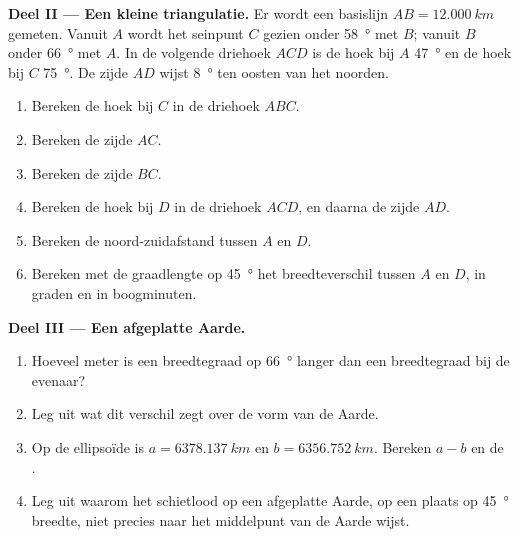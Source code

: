 \begin{problem}
\medskip
\noindent\textbf{Deel II --- Een kleine triangulatie.}
Er wordt een basislijn $AB = \qty{12.000}{km}$ gemeten. Vanuit $A$ wordt het
seinpunt $C$ gezien onder \qty{58}{\degree} met $B$; vanuit $B$ onder
\qty{66}{\degree} met $A$. In de volgende driehoek $ACD$ is de hoek bij $A$
\qty{47}{\degree} en de hoek bij $C$ \qty{75}{\degree}. De zijde $AD$ wijst
\qty{8}{\degree} ten oosten van het noorden.
\begin{enumerate}[resume]
  \item Bereken de hoek bij $C$ in de driehoek $ABC$.
  \item Bereken de zijde $AC$.
  \item Bereken de zijde $BC$.
  \item Bereken de hoek bij $D$ in de driehoek $ACD$, en daarna de zijde $AD$.
  \item Bereken de noord-zuidafstand tussen $A$ en $D$.
  \item Bereken met de graadlengte op \qty{45}{\degree} het breedteverschil
        tussen $A$ en $D$, in graden en in boogminuten.
\end{enumerate}

\medskip
\noindent\textbf{Deel III --- Een afgeplatte Aarde.}
\begin{enumerate}[resume]
  \item Hoeveel meter is een breedtegraad op \qty{66}{\degree} langer dan een
        breedtegraad bij de evenaar?
  \item Leg uit wat dit verschil zegt over de vorm van de Aarde.
  \item Op de ellipsoïde is $a = \qty{6378.137}{km}$ en
        $b = \qty{6356.752}{km}$. Bereken $a - b$ en de .
  \item Leg uit waarom het schietlood op een afgeplatte Aarde, op een plaats op
        \qty{45}{\degree} breedte, niet precies naar het middelpunt van de
        Aarde wijst.
\end{enumerate}


\end{problem}
